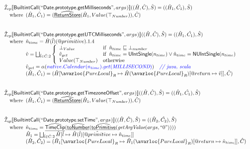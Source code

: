 \[
\begin{array}{l}

\aI _{cp}\lbr \SF{BuiltintCall}(``\SF{Date.prototype.getMilliseconds}",args_{})\rbr((\hat{H},\hat{C}), \hat{S})
  = ((\hat{H}_1, \hat{C_1}), \hat{S})\\
\quad\wherec{
  (\hat{H}_1, \hat{C}_1) = (\ahf{ReturnStore}(\hat{H}_1, Value(\top_{Number})), \hat{C})
  }\\
\\\\

\aI _{cp}\lbr \SF{BuiltintCall}(``\SF{Date.prototype.getUTCMilliseconds}",args_{})\rbr((\hat{H},\hat{C}), \hat{S})
  = ((\hat{H}_1, \hat{C_1}), \hat{S})\\
\quad\wherec{
  \hat{n}_{time} = \hat{H}(\hat{l})(\avarprop{primitive}).1.4\\
  \hat{v} = \bigsqcup_{\hat{l} \in \hat{C}.2} \left\{\begin{array}{ll}
      \bot_{Value} & \ifc{\hat{n}_{time} \sqsubseteq  \bot_{number}}\\
      \hat{v}_{get} &
      \ifc{\hat{n}_{time} = \SF{UIntSingle}(n_{time}) \lor\hat{n}_{time} = \SF{NUIntSingle}(n_{time}) }\\
      Value(\top_{Number}) & \owc
    \end{array}\right.\\
  \hat{v}_{get} = \alpha({\inblue native.Calendar(n_{time}).get(\emph{MILLISECOND})})
    \quad\comment{{\inblue // java, scala}}\\  
  (\hat{H}_1, \hat{C}_1) = 
    (\hat{H}[\avarloc{PureLocal}_R \mapsto \hat{H}(\avarloc{PureLocal}_R)
      [\varprop{return} \mapsto \hat{v}]], \hat{C})\\
  }\\
\\\\

\aI _{cp}\lbr \SF{BuiltintCall}(``\SF{Date.prototype.getTimezoneOffset}",args_{})\rbr((\hat{H},\hat{C}), \hat{S})
  = ((\hat{H}_1, \hat{C_1}), \hat{S})\\
\quad\wherec{
  (\hat{H}_1, \hat{C}_1) = (\ahf{ReturnStore}(\hat{H}_1, Value(\top_{Number})), \hat{C})
  }\\
\\\\

\aI _{cp}\lbr \SF{BuiltintCall}(``\SF{Date.prototype.setTime}",args_{})\rbr((\hat{H},\hat{C}), \hat{S})
  = ((\hat{H}_2, \hat{C_2}), \hat{S})\\
\quad\wherec{
  \hat{n}_{time} = \ahf{TimeClip}(\ahf{toNumber}(\ahf{toPrimitive}(\hf{getArgValue}(args, ``0"))))\\
  \hat{H}_1 = \bigsqcup_{\hat{l} \in \hat{C}.2} \hat{H}[\hat{l}
    \mapsto \hat{H}(\hat{l})[\avarprop{primitive} \mapsto \hat{n}_{time}]]\\
  (\hat{H}_2, \hat{C}_2) = 
    (\hat{H}_1[\avarloc{PureLocal}_R \mapsto \hat{H}_1(\avarloc{PureLocal}_R)
      [\varprop{return} \mapsto \hat{n}_{time}]], \hat{C})\\
  }\\
\\\\



\end{array}\]
